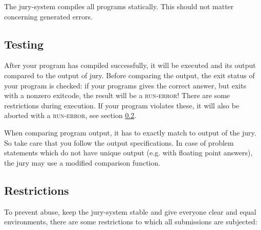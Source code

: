 The jury-system compiles all programs statically. This should not
matter concerning generated errors.

\subsection{Testing}

After your program has compiled successfully, it will be executed and
its output compared to the output of jury. Before comparing the
output, the exit status of your program is checked: if your programs
gives the correct answer, but exits with a nonzero exitcode, the
result will be a \textsc{run-error}! There are some restrictions during
execution. If your program violates these, it will also be aborted
with a \textsc{run-error}, see section \ref{runlimits}.

When comparing program output, it has to exactly match to output of
the jury. So take care that you follow the output specifications. In
case of problem statements which do not have unique output (e.g. with
floating point answers), the jury may use a modified comparison
function.

\subsection{Restrictions}\label{runlimits}

To prevent abuse, keep the jury-system stable and give everyone
clear and equal environments, there are some restrictions to which all
submissions are subjected:

